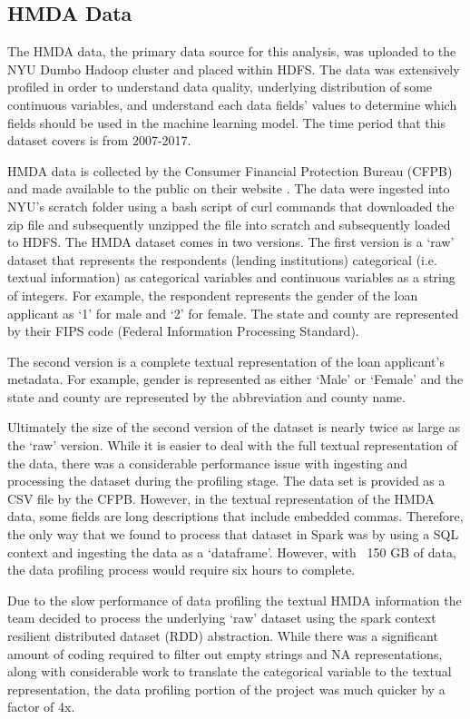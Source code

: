 \documentclass[conference,compsoc]{IEEEtran}
\begin{document}
\subsection{HMDA Data}

The HMDA data, the primary data source for this analysis, was uploaded to the NYU Dumbo Hadoop cluster and placed within HDFS.  The data was extensively profiled in order to understand data quality, underlying distribution of some continuous variables, and understand each data fields’ values to determine which fields should be used in the machine learning model.  The time period that this dataset covers is from 2007-2017. 

	HMDA data is collected by the Consumer Financial Protection Bureau (CFPB) and made available to the public on their website \cite{hmdalink}.  The data were ingested into NYU’s scratch folder using a bash script of curl commands that downloaded the zip file and subsequently unzipped the file into scratch and subsequently loaded to HDFS.  The HMDA dataset comes in two versions.  
The first version is a ‘raw’ dataset that represents the respondents (lending institutions) categorical (i.e. textual information) as categorical variables and continuous variables as a string of integers.  For example, the respondent represents the gender of the loan applicant as ‘1’ for male and ‘2’ for female.  The state and county are represented by their FIPS code (Federal Information Processing Standard).  

The second version is a complete textual representation of the loan applicant’s metadata.  For example, gender is represented as either ‘Male’ or ‘Female’ and the state and county are represented by the abbreviation and county name. 

Ultimately the size of the second version of the dataset is nearly twice as large as the ‘raw’ version.  While it is easier to deal with the full textual representation of the data, there was a considerable performance issue with ingesting and processing the dataset during the profiling stage.  The data set is provided as a CSV file by the CFPB.  However, in the textual representation of the HMDA data, some fields are long descriptions that include embedded commas.  Therefore, the only way that we found to process that dataset in Spark was by using a SQL context and ingesting the data as a ‘dataframe’.  However, with ~150 GB of data, the data profiling process would require six hours to complete.  

Due to the slow performance of data profiling the textual HMDA information the team decided to process the underlying ‘raw’ dataset using the spark context resilient distributed dataset (RDD) abstraction.  While there was a significant amount of coding required to filter out empty strings and NA representations, along with considerable work to translate the categorical variable to the textual representation, the data profiling portion of the project was much quicker by a factor of 4x. 
\end{document}
